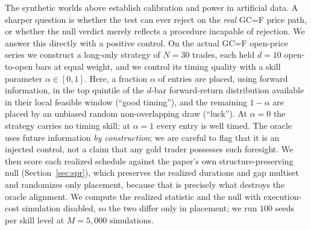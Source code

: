 \documentclass[preprint,12pt]{elsarticle}
\theoremstyle{definition}
\begin{document}
The synthetic worlds above establish calibration and power in artificial data. A sharper question is whether the test can ever reject on the \emph{real} GC=F price path, or whether the null verdict merely reflects a procedure incapable of rejection. We answer this directly with a positive control. On the actual GC=F open-price series we construct a long-only strategy of $N=30$ trades, each held $d=10$ open-to-open bars at equal weight, and we control its timing quality with a skill parameter $\alpha\in[0,1]$. Here, a fraction $\alpha$ of entries are placed, using forward information, in the top quintile of the $d$-bar forward-return distribution available in their local feasible window (``good timing''), and the remaining $1-\alpha$ are placed by an unbiased random non-overlapping draw (``luck''). At $\alpha=0$ the strategy carries no timing skill; at $\alpha=1$ every entry is well timed. The oracle uses future information \emph{by construction}; we are careful to flag that it is an injected control, not a claim that any gold trader possesses such foresight. We then score each realized schedule against the paper's own structure-preserving null (Section~\ref{sec:spr}), which preserves the realized durations and gap multiset and randomizes only placement, because that is precisely what destroys the oracle alignment. We compute the realized statistic and the null with execution-cost simulation disabled, so the two differ only in placement; we run $100$ seeds per skill level at $M=5{,}000$ simulations.
\end{document}
